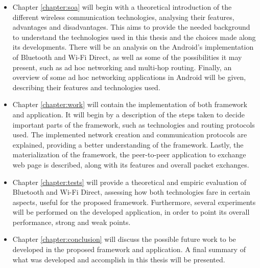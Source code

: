 \begin{itemize}
	
	\item Chapter \ref{chapter:soa} will begin with a theoretical introduction of the different wireless communication technologies, analysing their features, advantages and disadvantages. This aims to provide the needed background to understand the technologies used in this thesis and the choices made along its developments. There will be an analysis on the Android's implementation of Bluetooth and Wi-Fi Direct, as well as some of the possibilities it may present, such as ad hoc networking and multi-hop routing. Finally, an overview of some ad hoc networking applications in Android will be given, describing their features and technologies used.
	
	\item Chapter \ref{chapter:work} will contain the implementation of both framework and application. It will begin by a description of the steps taken to decide important parts of the framework, such as technologies and routing protocols used. The implemented network creation and communication protocols are explained, providing a better understanding of the framework. Lastly, the materialization of the framework, the peer-to-peer application to exchange web page is described, along with its features and overall packet exchanges.
	
	\item Chapter \ref{chapter:tests} will provide a theoretical and empiric evaluation of Bluetooth and Wi-Fi Direct, assessing how both technologies fare in certain aspects, useful for the proposed framework. Furthermore, several experiments will be performed on the developed application, in order to point its overall performance, strong and weak points.
	
	\item Chapter \ref{chapter:conclusion} will discuss the possible future work to be developed in the proposed framework and application. A final summary of what was developed and accomplish in this thesis will be presented.
	
\end{itemize}








